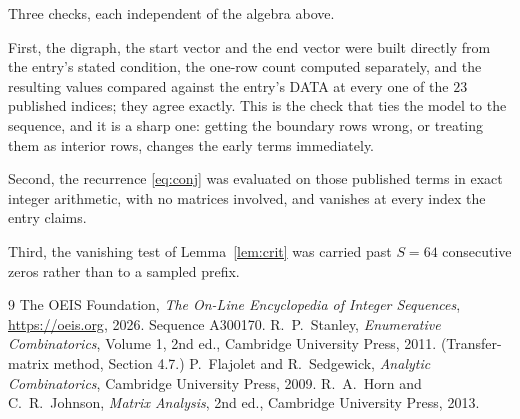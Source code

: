 \documentclass[11pt,a4paper]{article}
\theoremstyle{plain}
\theoremstyle{definition}
\begin{document}
Three checks, each independent of the algebra above.

First, the digraph, the start vector and the end vector were built directly from the
entry's stated condition, the one-row count computed separately, and the resulting values
compared against the entry's DATA at every one of the $23$ published indices; they
agree exactly. This is the check that ties the model to the sequence, and it is a sharp one:
getting the boundary rows wrong, or treating them as interior rows, changes the early terms
immediately.

Second, the recurrence \eqref{eq:conj} was evaluated on those published terms in exact
integer arithmetic, with no matrices involved, and vanishes at every index the entry claims.

Third, the vanishing test of Lemma~\ref{lem:crit} was carried past $S=64$ consecutive
zeros rather than to a sampled prefix.

\begin{thebibliography}{9}
 The OEIS Foundation, \emph{The On-Line Encyclopedia of Integer
Sequences}, \url{https://oeis.org}, 2026. Sequence A300170.
 R.~P.~Stanley, \emph{Enumerative Combinatorics}, Volume 1, 2nd ed.,
Cambridge University Press, 2011. (Transfer-matrix method, Section 4.7.)
 P.~Flajolet and R.~Sedgewick, \emph{Analytic Combinatorics}, Cambridge
University Press, 2009.
 R.~A.~Horn and C.~R.~Johnson, \emph{Matrix Analysis}, 2nd ed., Cambridge
University Press, 2013.
\end{thebibliography}
\end{document}
